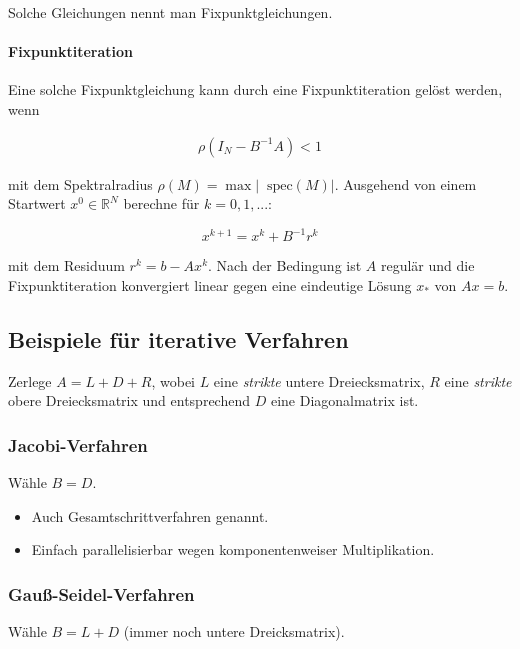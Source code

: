 \documentclass[a4paper, 14pt]{article}
\newcommand*\Spektrum{\mathop{}\!\mathrm{spec}}
\begin{document}
	Solche Gleichungen nennt man Fixpunktgleichungen.

	\paragraph{Fixpunktiteration}

	Eine solche Fixpunktgleichung kann durch eine Fixpunktiteration gelöst werden, wenn

	\begin{align}
		\rho(I_N - B^{-1} A) < 1
	\end{align}

	mit dem Spektralradius $\rho(M) = \max | \Spektrum(M) |$.
	Ausgehend von einem Startwert $x^0 \in \mathbb{R}^N$ berechne für $k = 0, 1, ...$:

	\begin{equation}
		x^{k + 1} = x^k + B^{-1} r^k
	\end{equation}

	mit dem Residuum $r^k = b - A x^k$.
	Nach der Bedingung ist $A$ regulär und die Fixpunktiteration konvergiert linear gegen eine eindeutige Lösung $x_*$ von $Ax = b$.

	\subsection{Beispiele für iterative Verfahren}

	Zerlege $A = L + D +R$, wobei $L$ eine \emph{strikte} untere Dreiecksmatrix, $R$ eine \emph{strikte} obere Dreiecksmatrix und entsprechend $D$ eine Diagonalmatrix ist.

	\subsubsection{Jacobi-Verfahren}

	Wähle $B = D$.

	\begin{itemize}
		\item Auch Gesamtschrittverfahren genannt.
		\item Einfach parallelisierbar wegen komponentenweiser Multiplikation.
	\end{itemize}

	\subsubsection{Gauß-Seidel-Verfahren}

	Wähle $B = L + D$ (immer noch untere Dreicksmatrix).
\end{document}
